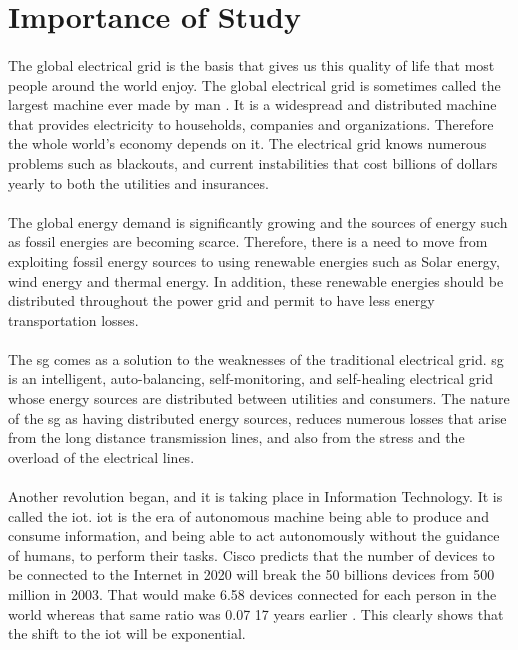 \documentclass[12pt,a4paper,final]{report}
\begin{document}
\section{Importance of Study}
\paragraph{}
The global electrical grid is the basis that gives us this quality of life that most people around the world enjoy. The global electrical grid is sometimes called the largest machine ever made by man \cite{ref1}. It is a widespread and distributed machine that provides electricity to households, companies and organizations. Therefore the whole world's economy depends on it. The electrical grid knows numerous problems such as blackouts, and current instabilities that cost billions of dollars yearly to both the utilities and insurances.
\paragraph{}
The global energy demand is significantly growing and the sources of energy such as fossil energies are becoming scarce. Therefore, there is a need to move from exploiting fossil energy sources to using renewable energies such as Solar energy, wind energy and thermal energy. In addition, these renewable energies should be distributed throughout the power grid and permit to have less energy transportation losses.
\paragraph{}
The \gls{sg} comes as a solution to the weaknesses of the traditional electrical grid. \gls{sg} is an intelligent, auto-balancing, self-monitoring, and self-healing electrical grid \cite{ref2} whose energy sources are distributed between utilities and consumers. The nature of the \gls{sg} as having distributed energy sources, reduces numerous losses that arise from the long distance transmission lines, and also from the stress and the overload of the electrical lines.
\paragraph{}
Another revolution began, and it is taking place in Information Technology. It is called the \gls{iot}. \gls{iot} is the era of autonomous machine being able to produce and consume information, and being able to act autonomously without the guidance of humans, to perform their tasks. Cisco predicts that the number of devices to be connected to the Internet in 2020 will break the 50 billions devices from 500 million in 2003. That would make 6.58 devices connected for each person in the world whereas that same ratio was 0.07 17 years earlier \cite{ref3}. This clearly shows that the shift to the \gls{iot} will be exponential.
\end{document}
